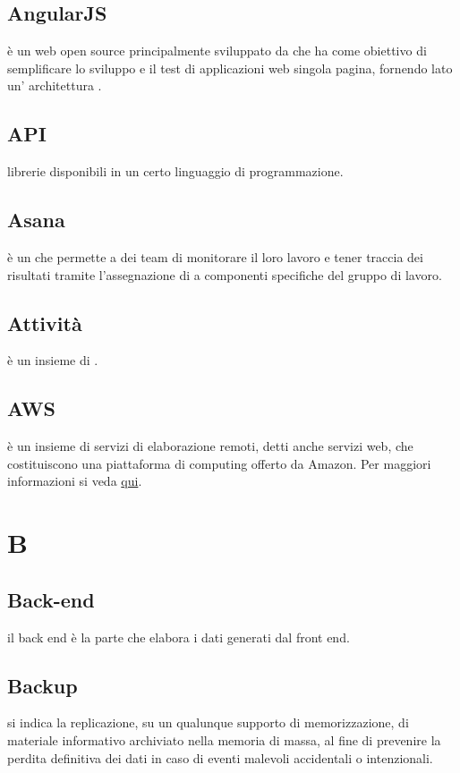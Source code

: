 \documentclass[12pt,a4paper]{article}
\begin{document}
\subsection{AngularJS}
è un  web open source principalmente sviluppato da  che ha come obiettivo di semplificare lo sviluppo e il test di applicazioni web singola pagina, fornendo lato  un' architettura .

\subsection{API}
librerie  disponibili in un certo linguaggio di programmazione.

\subsection{Asana}
è un  che permette a dei team di monitorare il loro lavoro e tener traccia dei risultati tramite l'assegnazione di  a componenti specifiche del gruppo di lavoro.

\subsection{Attività}
è un insieme di .

\subsection{AWS}
è un insieme di servizi di elaborazione remoti, detti anche servizi web, che costituiscono una piattaforma di computing offerto da Amazon. Per maggiori informazioni si veda \href{https://aws.amazon.com/it/}{qui}.


\newpage

\section{B}\label{gloss-b}

\subsection{Back-end}
il back end è la parte che elabora i dati generati dal front end.

\subsection{Backup}
si indica la replicazione, su un qualunque supporto di memorizzazione, di materiale informativo archiviato nella memoria di massa, al fine di prevenire la perdita definitiva dei dati in caso di eventi malevoli accidentali o intenzionali.
\end{document}
